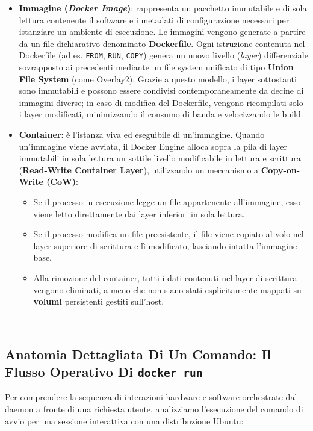 \documentclass[11pt, a4paper]{article}
\begin{document}
\begin{itemize}
    \item \textbf{Immagine (\emph{Docker Image})}: rappresenta un pacchetto immutabile e di sola lettura contenente il software e i metadati di configurazione necessari per istanziare un ambiente di esecuzione. Le immagini vengono generate a partire da un file dichiarativo denominato \textbf{Dockerfile}. Ogni istruzione contenuta nel Dockerfile (ad es. \texttt{FROM}, \texttt{RUN}, \texttt{COPY}) genera un nuovo livello (\emph{layer}) differenziale sovrapposto ai precedenti mediante un file system unificato di tipo \textbf{Union File System} (come Overlay2). Grazie a questo modello, i layer sottostanti sono immutabili e possono essere condivisi contemporaneamente da decine di immagini diverse; in caso di modifica del Dockerfile, vengono ricompilati solo i layer modificati, minimizzando il consumo di banda e velocizzando le build.
    \item \textbf{Container}: è l'istanza viva ed eseguibile di un'immagine. Quando un'immagine viene avviata, il Docker Engine alloca sopra la pila di layer immutabili in sola lettura un sottile livello modificabile in lettura e scrittura (\textbf{Read-Write Container Layer}), utilizzando un meccanismo a \textbf{Copy-on-Write (CoW)}:
    \begin{itemize}
        \item Se il processo in esecuzione legge un file appartenente all'immagine, esso viene letto direttamente dai layer inferiori in sola lettura.
        \item Se il processo modifica un file preesistente, il file viene copiato al volo nel layer superiore di scrittura e lì modificato, lasciando intatta l'immagine base.
        \item Alla rimozione del container, tutti i dati contenuti nel layer di scrittura vengono eliminati, a meno che non siano stati esplicitamente mappati su \textbf{volumi} persistenti gestiti sull'host.
    \end{itemize}
\end{itemize}

---

\subsection{Anatomia Dettagliata Di Un Comando: Il Flusso Operativo Di \texttt{docker run}}

Per comprendere la sequenza di interazioni hardware e software orchestrate dal daemon a fronte di una richiesta utente, analizziamo l'esecuzione del comando di avvio per una sessione interattiva con una distribuzione Ubuntu:
\end{document}
